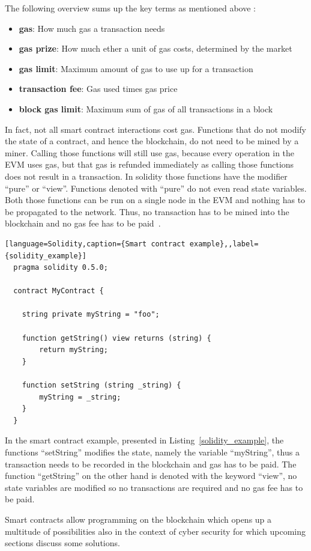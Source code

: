 The following overview sums up the key terms as mentioned above \cite{blockgeeks}:
\begin{itemize}
  \item {\textbf{gas}: How much gas a transaction needs }
  \item {\textbf{gas prize}: How much ether a unit of gas costs, determined by the market}
  \item {\textbf{gas limit}: Maximum amount of gas to use up for a transaction}
  \item {\textbf{transaction fee}: Gas used times gas price}
  \item {\textbf{block gas limit}: Maximum sum of gas of all transactions in a block}

\end{itemize}

In fact, not all smart contract interactions cost gas. Functions that do not modify the state of a contract, and hence the blockchain, do not need to be mined by a miner.
Calling those functions will still use gas, because every operation in the EVM uses gas, but that gas is refunded immediately as calling those functions does not result in a transaction.
In solidity those functions have the modifier ``pure'' or ``view''. Functions denoted with ``pure'' do not even read state variables. Both those functions can be run on a single node in the EVM and
nothing has to be propagated to the network. Thus, no transaction has to be mined into the blockchain and no gas fee has to be paid~\cite{blockgeeks}.

\begin{lstlisting}[language=Solidity,caption={Smart contract example},,label={solidity_example}]
  pragma solidity 0.5.0;

  contract MyContract {

    string private myString = "foo";

    function getString() view returns (string) {
        return myString;
    }

    function setString (string _string) {
        myString = _string;
    }
  }
  \end{lstlisting}

In the smart contract example, presented in Listing~\ref{solidity_example}, the functions ``setString'' modifies the state, namely the variable ``myString'', thus a transaction needs to be recorded in the blockchain and gas has to be paid.
The function ``getString'' on the other hand is denoted with the keyword ``view'', no state variables are modified so no transactions are required and no gas fee has to be paid.

Smart contracts allow programming on the blockchain which opens up a multitude of possibilities also in the context of cyber security for which upcoming sections discuss some solutions.
